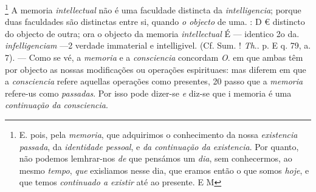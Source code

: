 \footnote{E. pois, pela \emph{memoria}, que adquirimos o conhecimento da nossa \emph{existencia passada}, da \emph{identidade pessoal}, e \emph{da continuação da existencia}. Por quanto, não podemos lemhrar-nos \emph{de} que pensámos um \emph{dia}, sem conhecermos, ao mesmo \emph{tempo}, \emph{que} exisliamos nesse dia, que eramos então o que somos \emph{hoje}, e que temos \emph{continuado a existir} até ao presente. E M} A memoria \emph{intellectual} não é uma faculdade distincta da \emph{intelligencia}; porque duas faculdades são distinctas entre si, quando \emph{o objecto} de uma. : D € distincto do objecto de outra; ora o objecto da memoria \emph{intellectual} É --- identico 2o da. \emph{infelligenciam} ---2 verdade immaterial e intelligivel. (Cf. Sum. ! \emph{Th}.. p. E q. 79, a. 7). --- Como se vé, a \emph{memoria} e a \emph{consciencia} concordam \emph{O}. em que ambas têm por objecto as nossas modificações ou operações espirituaes: mas diferem em que a \emph{consciencia} refere aquellas operações como presentes, 20 passo que a \emph{memoria} refere-us como \emph{passadas}. Por isso pode dizer-se \emph{e} diz-se que i memoria é uma \emph{continuação da consciencia}.

